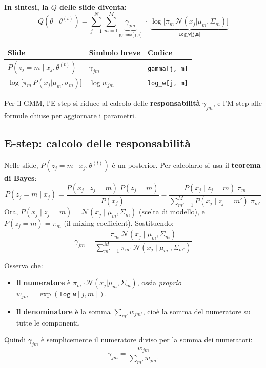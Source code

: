 \documentclass[11pt,a4paper]{article}
\begin{document}
\begin{infobox}
\bigskip
\textbf{In sintesi, la $Q$ delle slide diventa:}
\[
  Q(\theta \mid \theta^{(t)})
  = \sum_{j=1}^{N}\sum_{m=1}^{M}
    \underbrace{\gamma_{jm}}_{\texttt{gamma[j,m]}}
    \;\cdot\;
    \underbrace{\log\!\bigl[\pi_m\,\mathcal{N}(x_j|\mu_m,\Sigma_m)\bigr]}
              _{\texttt{log\_w[j,m]}}
\]

\medskip
\begin{center}
\renewcommand{\arraystretch}{1.4}
\begin{tabular}{lll}
\toprule
\textbf{Slide} & \textbf{Simbolo breve} & \textbf{Codice} \\
\midrule
$P(z_j{=}m \mid x_j, \theta^{(t)})$
  & $\gamma_{jm}$ & \texttt{gamma[j, m]} \\
$\log\bigl[\pi_m\,P(x_j|\mu_m,\sigma_m)\bigr]$
  & $\log w_{jm}$ & \texttt{log\_w[j, m]} \\
\bottomrule
\end{tabular}
\end{center}
\end{infobox}

Per il GMM, l'E-step si riduce al calcolo delle \textbf{responsabilit\`{a}}
$\gamma_{jm}$, e l'M-step alle formule chiuse per aggiornare i parametri.

\subsection{E-step: calcolo delle responsabilit\`{a}}

\begin{infobox}
Nelle slide, $P(z_j = m \mid x_j, \theta^{(t)})$ \`{e} un posterior.
Per calcolarlo si usa il \textbf{teorema di Bayes}:
\[
  P(z_j{=}m \mid x_j)
  = \frac{P(x_j \mid z_j{=}m)\;P(z_j{=}m)}
         {P(x_j)}
  = \frac{P(x_j \mid z_j{=}m)\;\pi_m}
         {\sum_{m'=1}^{M} P(x_j \mid z_j{=}m')\;\pi_{m'}}
\]
Ora, $P(x_j \mid z_j{=}m) = \mathcal{N}(x_j \mid \mu_m, \Sigma_m)$
(scelta di modello), e $P(z_j{=}m) = \pi_m$ (il mixing coefficient).
Sostituendo:
\begin{equation}\label{eq:gamma}
  \gamma_{jm}
  = \frac{\pi_m \;\mathcal{N}(x_j \mid \mu_m, \Sigma_m)}
         {\sum_{m'=1}^{M} \pi_{m'}\;\mathcal{N}(x_j \mid \mu_{m'}, \Sigma_{m'})}
\end{equation}

Osserva che:
\begin{itemize}[nosep]
  \item Il \textbf{numeratore} \`{e} $\pi_m \cdot \mathcal{N}(x_j|\mu_m,\Sigma_m)$,
        ossia \emph{proprio} $w_{jm} = \exp(\texttt{log\_w}[j,m])$.
  \item Il \textbf{denominatore} \`{e} la somma $\sum_{m'} w_{jm'}$,
        cio\`{e} la somma del numeratore su tutte le componenti.
\end{itemize}

Quindi $\gamma_{jm}$ \`{e} semplicemente il numeratore diviso per la
somma dei numeratori:
\[
  \gamma_{jm} = \frac{w_{jm}}{\sum_{m'} w_{jm'}}
\]
\end{infobox}
\end{document}
